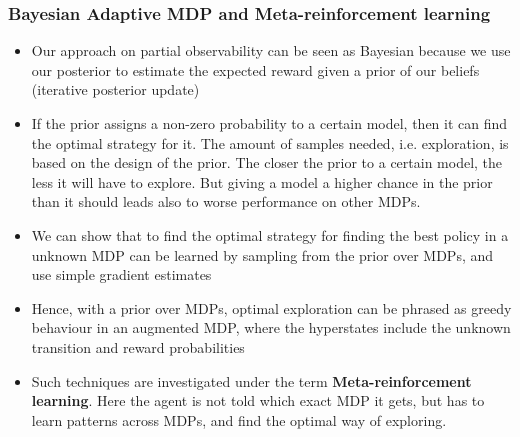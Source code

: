 \subsubsection{Bayesian Adaptive MDP and Meta-reinforcement learning}
\begin{itemize}
	\item Our approach on partial observability can be seen as Bayesian because we use our posterior to estimate the expected reward given a prior of our beliefs (iterative posterior update)
	\item If the prior assigns a non-zero probability to a certain model, then it can find the optimal strategy for it. The amount of samples needed, i.e. exploration, is based on the design of the prior. The closer the prior to a certain model, the less it will have to explore. But giving a model a higher chance in the prior than it should leads also to worse performance on other MDPs.
	\item We can show that to find the optimal strategy for finding the best policy in a unknown MDP can be learned by sampling from the prior over MDPs, and use simple gradient estimates
	\item Hence, with a prior over MDPs, optimal exploration can be phrased as greedy behaviour in an augmented MDP, where the hyperstates include the unknown transition and reward probabilities
	\item Such techniques are investigated under the term \textbf{Meta-reinforcement learning}. Here the agent is not told which exact MDP it gets, but has to learn patterns across MDPs, and find the optimal way of exploring.
\end{itemize}